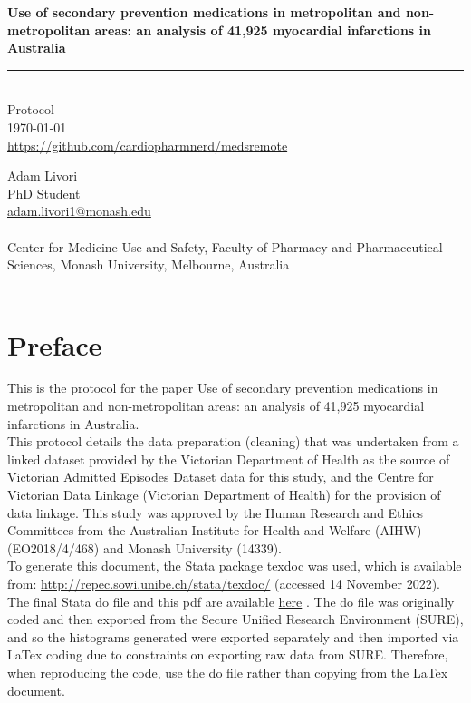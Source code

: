 \documentclass[11pt]{article}
\newcommand{\thedate}{\today}
\begin{document}
\begin{titlepage}
  \begin{flushright}
        \Huge
        \textbf{Use of secondary prevention medications in metropolitan and non-metropolitan areas: an analysis of 41,925  myocardial infarctions in Australia}
\color{violet}
\rule{16cm}{2mm} \\
\Large
\color{black}
Protocol \\
\thedate \\
\color{blue}
\url{https://github.com/cardiopharmnerd/medsremote} \\
\color{black}
       \vfill
    \end{flushright}
        \Large

\noindent
Adam Livori \\
PhD Student \\
\color{blue}
\href{mailto:adam.livori1@Monash.edu}{adam.livori1@monash.edu} \\ 
\color{black}
\\
Center for Medicine Use and Safety, Faculty of Pharmacy and Pharmaceutical Sciences, Monash University, Melbourne, Australia \\
\\
\end{titlepage}

\pagebreak
\tableofcontents
\pagebreak
\listoffigures
\pagebreak

\pagebreak
\section{Preface}

This is the protocol for the paper Use of secondary prevention medications in metropolitan and non-metropolitan areas: an analysis of 41,925 myocardial infarctions in Australia. \\
This protocol details the data preparation (cleaning) that was undertaken from a linked dataset provided by the Victorian Department of Health as the source of Victorian Admitted Episodes Dataset data for this study, and the Centre for Victorian Data Linkage (Victorian Department of Health) for the provision of data linkage. This study was approved by the Human Research and Ethics Committees from the Australian Institute for Health and Welfare (AIHW) (EO2018/4/468) and Monash University (14339). \\
To generate this document, the Stata package texdoc was used, which is available from: \color{blue} \url{http://repec.sowi.unibe.ch/stata/texdoc/} \color{black} (accessed 14 November 2022). The final Stata do file and this pdf are available \color{blue} \href{https://github.com/jimb0w/BA}{here} \color{black}. The do file was originally coded and then exported from the Secure Unified Research Environment (SURE), and so the histograms generated were exported separately and then imported via LaTex coding due to constraints on exporting raw data from SURE. Therefore, when reproducing the code, use the do file rather than copying from the LaTex document. 
\end{document}
